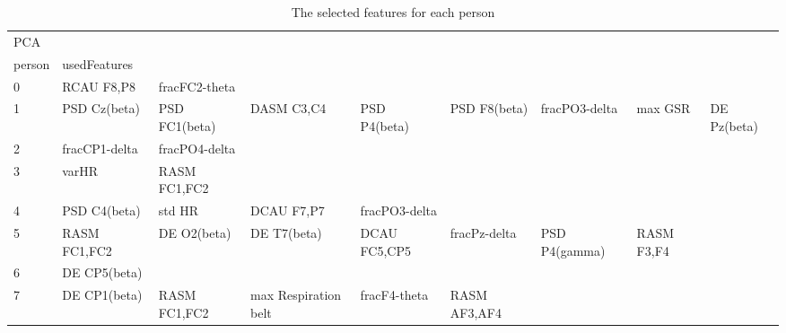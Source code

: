 \clearpage
\begin{landscape}
\begin{table}[]
\centering
\caption{The selected features for each person}
\begin{tabular}{l|llllllll}
PCA                &                      &                         &                      &                    &                       &                      &                 &                 \\
person             & usedFeatures         &                         &                      &                    &                       &                      &                 &                 \\
0                  & RCAU F8,P8           & fracFC2-theta           &                      &                    &                       &                      &                 &                 \\
1                  & PSD Cz(beta)         & PSD FC1(beta)           & DASM C3,C4           & PSD P4(beta)       & PSD F8(beta)          & fracPO3-delta        & max GSR         & DE Pz(beta)     \\
2                  & fracCP1-delta        & fracPO4-delta           &                      &                    &                       &                      &                 &                 \\
3                  & varHR                & RASM FC1,FC2            &                      &                    &                       &                      &                 &                 \\
4                  & PSD C4(beta)         & std HR                  & DCAU F7,P7           & fracPO3-delta      &                       &                      &                 &                 \\
5                  & RASM FC1,FC2         & DE O2(beta)             & DE T7(beta)          & DCAU FC5,CP5       & fracPz-delta          & PSD P4(gamma)        & RASM F3,F4      &                 \\
6                  & DE CP5(beta)         &                         &                      &                    &                       &                      &                 &                 \\
7                  & DE CP1(beta)         & RASM FC1,FC2            & max Respiration belt & fracF4-theta       & RASM AF3,AF4          &                      &                 &                 \\

\end{tabular}
\end{table}
\end{landscape}

